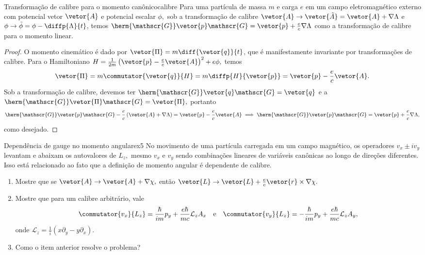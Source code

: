 \begin{lemma}{Transformação de calibre para o momento canônico}{calibre}
   Para uma partícula de massa \(m\) e carga \(e\) em um campo eletromagnético externo com potencial vetor \(\vetor{A}\) e potencial escalar \(\phi,\) sob a transformação de calibre \(\vetor{A} \to \vetor{\tilde{A}} = \vetor{A} + \nabla \Lambda\) e \(\phi \to \tilde{\phi} = \phi - \diffp{\Lambda}{t}\), temos \(\herm{\mathscr{G}} \vetor{p} \mathscr{G} = \vetor{p} + \frac{e}{c} \nabla \Lambda\) como a transformação de calibre para o momento linear.
\end{lemma}
\begin{proof}
   O momento cinemático é dado por \(\vetor{\Pi} = m \diff{\vetor{q}}{t}\), que é manifestamente invariante por transformações de calibre. Para o Hamiltoniano \(H = \frac1{2m}\left(\vetor{p} - \frac{e}{c} \vetor{A}\right)^2 + e\phi,\) temos
   \begin{equation*}
      \vetor{\Pi} = m \commutator{\vetor{q}}{H} = m \diffp{H}{\vetor{p}} = \vetor{p} - \frac{e}{c} \vetor{A}.
   \end{equation*}
   Sob a transformação de calibre, devemos ter \(\herm{\mathscr{G}}\vetor{q}\mathscr{G} = \vetor{q}\) e a \(\herm{\mathscr{G}}\vetor{\Pi}\mathscr{G} = \vetor{\Pi},\) portanto
   \begin{equation*}
      \herm{\mathscr{G}} \vetor{p}\mathscr{G} - \frac{e}{c} \left(\vetor{A} + \nabla \Lambda\right)= \vetor{p} - \frac{e}{c} \vetor{A} \implies \herm{\mathscr{G}}\vetor{p}\mathscr{G} = \vetor{p} + \frac{e}{c} \nabla \Lambda,
   \end{equation*}
   como desejado.
\end{proof}
\begin{exercício}{Dependência de gauge no momento angular}{ex5}
   No movimento de uma partícula carregada em um campo magnético, os operadores \(v_x \pm i v_y\) levantam e abaixam os autovalores de \(L_z,\) mesmo \(v_x\) e \(v_y\) sendo combinações lineares de variáveis canônicas ao longo de direções diferentes. Isso está relacionado ao fato que a definição de momento angular é dependente de calibre.
   \begin{enumerate}[label=(\alph*)]
      \item Mostre que se \(\vetor{A} \to \vetor{A} + \nabla\chi,\) então \(\vetor{L} \to \vetor{L} + \frac{e}{c} \vetor{r} \times \nabla\chi.\)
      \item Mostre que para um calibre arbitrário, vale
         \begin{equation*}
            \commutator{v_x}{L_z} = \frac{\hbar}{im} p_y + \frac{e \hbar}{mc} \mathcal{L}_z A_x
            \quad\text{e}\quad
            \commutator{v_y}{L_z} = -\frac{\hbar}{im} p_y + \frac{e \hbar}{mc} \mathcal{L}_z A_y,
         \end{equation*}
         onde \(\mathcal{L}_z = \frac1i \left(x \partial_y - y \partial_x\right).\)
      \item Como o item anterior resolve o problema?
   \end{enumerate}
\end{exercício}

